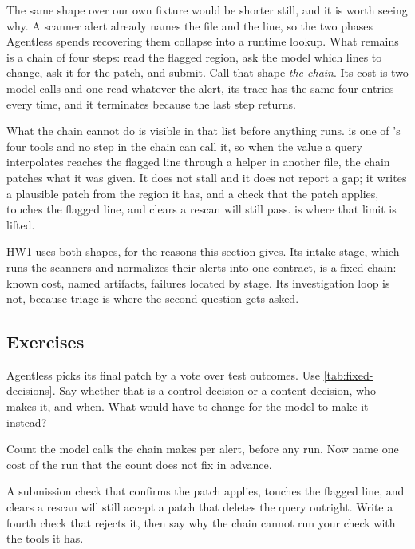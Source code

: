 The same shape over our own fixture would be shorter still, and it is worth seeing why. A scanner
alert already names the file and the line, so the two phases Agentless spends recovering them
collapse into a runtime lookup. What remains is a chain of four steps: read the flagged region, ask
the model which lines to change, ask it for the patch, and submit. Call that shape \emph{the
chain}. Its cost is two model calls and one read whatever the alert, its trace has the same four
entries every time, and it terminates because the last step returns.

What the chain cannot do is visible in that list before anything runs.  is one of
\msa{}'s four tools and no step in the chain can call it, so when the value a query interpolates
reaches the flagged line through a helper in another file, the chain patches what it was given. It
does not stall and it does not report a gap; it writes a plausible patch from the region it has,
and a check that the patch applies, touches the flagged line, and clears a rescan will still pass.
 is where that limit is lifted.

HW1 uses both shapes, for the reasons this section gives. Its intake stage, which runs the scanners
and normalizes their alerts into one contract, is a fixed chain: known cost, named artifacts,
failures located by stage. Its investigation loop is not, because triage is where the second
question gets asked.

\subsection{Exercises}

\be

\item Agentless picks its final patch by a vote over test outcomes. Use
\cref{tab:fixed-decisions}. Say whether that is a control decision or a content decision, who
makes it, and when. What would have to change for the model to make it instead?

\item Count the model calls the chain makes per alert, before any run. Now name one cost of the
run that the count does not fix in advance.

\item A submission check that confirms the patch applies, touches the flagged line, and clears a
rescan will still accept a patch that deletes the query outright. Write a fourth check that rejects
it, then say why the chain cannot run your check with the tools it has.

